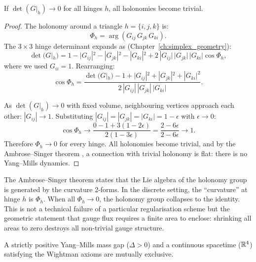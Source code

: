 \begin{lemma}
\label{lem:fiber}
If $\det(G|_h) \to 0$ for all hinges $h$, all holonomies become
trivial.
\end{lemma}

\begin{proof}
The holonomy around a triangle $h = \{i, j, k\}$ is:
\begin{equation}
\Phi_h = \arg(G_{ij}\, G_{jk}\, G_{ki}).
\end{equation}
The $3 \times 3$ hinge determinant expands as (Chapter~\ref{ch:simplex_geometry}):
\begin{equation}
\det(G|_h) = 1 - |G_{ij}|^2 - |G_{jk}|^2 - |G_{ki}|^2
  + 2\,|G_{ij}|\,|G_{jk}|\,|G_{ki}|\cos\Phi_h,
\end{equation}
where we used $G_{ii} = 1$.  Rearranging:
\begin{equation}
\cos\Phi_h = \frac{\det(G|_h) - 1 + |G_{ij}|^2 + |G_{jk}|^2 + |G_{ki}|^2}
{2\,|G_{ij}|\,|G_{jk}|\,|G_{ki}|}.
\label{eq:cosPhidet}
\end{equation}

As $\det(G|_h) \to 0$ with fixed volume, neighbouring vertices approach
each other: $|G_{ij}| \to 1$.  Substituting
$|G_{ij}| = |G_{jk}| = |G_{ki}| = 1 - \epsilon$ with
$\epsilon \to 0$:
\begin{equation}
\cos\Phi_h \to \frac{0 - 1 + 3(1 - 2\epsilon)}{2(1 - 3\epsilon)}
= \frac{2 - 6\epsilon}{2 - 6\epsilon} \to 1.
\end{equation}
Therefore $\Phi_h \to 0$ for every hinge.  All holonomies become
trivial, and by the Ambrose--Singer theorem \cite{Ambrose-Singer},
a connection with trivial holonomy is flat: there is no Yang--Mills
dynamics.
\end{proof}

\begin{remark}
The Ambrose--Singer theorem states that the Lie algebra of the holonomy
group is generated by the curvature 2-forms.  In the discrete setting,
the ``curvature'' at hinge $h$ is $\Phi_h$.  When all $\Phi_h \to 0$,
the holonomy group collapses to the identity.  This is not a technical
failure of a particular regularisation scheme but the geometric statement
that gauge flux requires a finite area to enclose: shrinking all areas
to zero destroys all non-trivial gauge structure.
\end{remark}

\begin{theorem}[No-Go]
\label{thm:nogo}
A strictly positive Yang--Mills mass gap ($\Delta > 0$) and a continuous
spacetime ($\mathbb{R}^4$) satisfying the Wightman axioms are mutually
exclusive.
\end{theorem}

